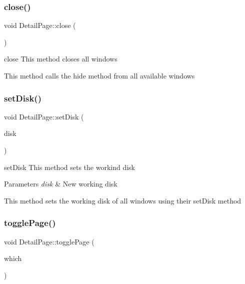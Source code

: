 \subsubsection{\texorpdfstring{close()}{close()}}
{\footnotesize\ttfamily void Detail\+Page\+::close (\begin{DoxyParamCaption}\item[{void}]{ }\end{DoxyParamCaption})}



close This method closes all windows 

This method calls the hide method from all available windows \mbox{\label{class_detail_page_a0eb56c55a66d26ca956ebb9f30ca8538}} 
\subsubsection{\texorpdfstring{set\+Disk()}{setDisk()}}
{\footnotesize\ttfamily void Detail\+Page\+::set\+Disk (\begin{DoxyParamCaption}\item[{\mbox{\hyperlink{classdisk_1_1_disk}{disk\+::\+Disk}} $\ast$}]{disk }\end{DoxyParamCaption})}



set\+Disk This method sets the workind disk 


\begin{DoxyParams}{Parameters}
{\em disk} & New working disk\\
\hline
\end{DoxyParams}
This method sets the working disk of all windows using their set\+Disk method \mbox{\label{class_detail_page_a1bbc24ad94c66e55e29ba208586a5bf5}} 
\subsubsection{\texorpdfstring{toggle\+Page()}{togglePage()}}
{\footnotesize\ttfamily void Detail\+Page\+::toggle\+Page (\begin{DoxyParamCaption}\item[{Detail\+Page\+::display}]{which }\end{DoxyParamCaption})}



